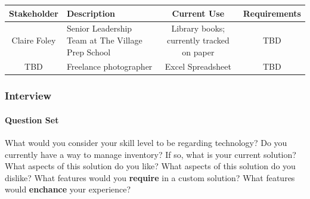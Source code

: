 \documentclass{article}
\begin{document}
\newcommand{\stakeholderEntry}[4]{{#1} & {#2} & {#3} & {#4}\\\hline}

\begin{tabular}{ |c|p{}|c|c| }
    \hline
    \textbf{Stakeholder} & \textbf{Description} & \textbf{Current Use} & \textbf{Requirements}\\
    \hline

    \stakeholderEntry
        {Claire Foley}
        {Senior Leadership Team at The Village Prep School}
        {Library books; currently tracked on paper}
        {TBD}
    
    \stakeholderEntry
        {TBD}{Freelance photographer}{Excel Spreadsheet}{TBD}
    \hline
\end{tabular}


\subsubsection{Interview}

\paragraph{Question Set}
\begin{outline}
    \1 What would you consider your skill level to be regarding technology?
    \1 Do you currently have a way to manage inventory?
    \2 If so, what is your current solution?
    \3 What aspects of this solution do you like?
    \3 What aspects of this solution do you dislike?
    \2 What features would you \textbf{require} in a custom solution?
    \2 What features would \textbf{enchance} your experience?
\end{outline}
\end{document}
